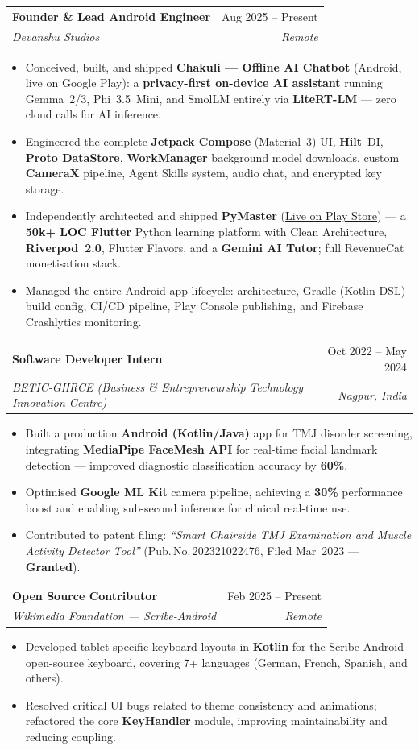 \documentclass[letterpaper,11pt]{article}
\makeatletter
\newcommand{\pnum}[1]{Pub.\,No.\,#1}
\newcommand{\resumeItem}[1]{\item\small{#1}}
\newcommand{\resumeSubheading}[4]{
  \vspace{-1pt}\item
    \begin{tabular*}{0.97\textwidth}[t]{l@{\extracolsep{\fill}}r}
      \textbf{#1} & \small #2 \\
      \textit{\small #3} & \textit{\small #4} \\
    \end{tabular*}\vspace{-5pt}
}
\newcommand{\resumeItemListStart}{
  \begin{itemize}[leftmargin=0.20in, itemsep=1pt, parsep=0pt, topsep=2pt]
}
\newcommand{\resumeItemListEnd}{\end{itemize}\vspace{2pt}}
\makeatother
\begin{document}
  \resumeSubheading
    {Founder \& Lead Android Engineer}{Aug 2025 -- Present}
    {Devanshu Studios}{Remote}
    \resumeItemListStart
      \resumeItem{Conceived, built, and shipped \textbf{Chakuli — Offline AI Chatbot} (Android, live on Google Play): a \textbf{privacy-first on-device AI assistant} running Gemma~2/3, Phi~3.5~Mini, and SmolLM entirely via \textbf{LiteRT-LM} — zero cloud calls for AI inference.}
      \resumeItem{Engineered the complete \textbf{Jetpack Compose} (Material~3) UI, \textbf{Hilt}~DI, \textbf{Proto DataStore}, \textbf{WorkManager} background model downloads, custom \textbf{CameraX} pipeline, Agent Skills system, audio chat, and encrypted key storage.}
      \resumeItem{Independently architected and shipped \textbf{PyMaster} (\href{https://play.google.com/store/apps/details?id=com.devanshustudios.pymaster}{\underline{Live on Play Store}}) — a \textbf{50k+ LOC Flutter} Python learning platform with Clean Architecture, \textbf{Riverpod~2.0}, Flutter Flavors, and a \textbf{Gemini AI Tutor}; full RevenueCat monetisation stack.}
      \resumeItem{Managed the entire Android app lifecycle: architecture, Gradle (Kotlin DSL) build config, CI/CD pipeline, Play Console publishing, and Firebase Crashlytics monitoring.}
    \resumeItemListEnd

  \resumeSubheading
    {Software Developer Intern}{Oct 2022 -- May 2024}
    {BETIC-GHRCE (Business \& Entrepreneurship Technology Innovation Centre)}{Nagpur, India}
    \resumeItemListStart
      \resumeItem{Built a production \textbf{Android (Kotlin/Java)} app for TMJ disorder screening, integrating \textbf{MediaPipe FaceMesh API} for real-time facial landmark detection — improved diagnostic classification accuracy by \textbf{60\%}.}
      \resumeItem{Optimised \textbf{Google ML Kit} camera pipeline, achieving a \textbf{30\%} performance boost and enabling sub-second inference for clinical real-time use.}
      \resumeItem{Contributed to patent filing: \textit{``Smart Chairside TMJ Examination and Muscle Activity Detector Tool''} (\pnum{202321022476}, Filed Mar~2023 — \textbf{Granted}).}
    \resumeItemListEnd

  \resumeSubheading
    {Open Source Contributor}{Feb 2025 -- Present}
    {Wikimedia Foundation — Scribe-Android}{Remote}
    \resumeItemListStart
      \resumeItem{Developed tablet-specific keyboard layouts in \textbf{Kotlin} for the Scribe-Android open-source keyboard, covering 7+ languages (German, French, Spanish, and others).}
      \resumeItem{Resolved critical UI bugs related to theme consistency and animations; refactored the core \textbf{KeyHandler} module, improving maintainability and reducing coupling.}
    \resumeItemListEnd
\end{document}
